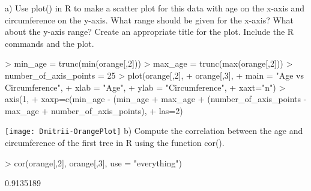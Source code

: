 \documentclass[12pt]{article}
\begin{document}
a) Use plot() in R to make a scatter plot for this data with age on the x-axis and
circumference on the y-axis. What range should be given for the x-axis? What about
the y-axis range? Create an appropriate title for the plot. Include the R commands and
the plot.

\begin{Schunk}
\begin{Sinput}
> min_age = trunc(min(orange[,2]))
> max_age = trunc(max(orange[,2]))
> number_of_axis_points = 25
> plot(orange[,2], 
+      orange[,3], 
+      main = "Age vs Circumference", 
+      xlab = "Age", 
+      ylab = "Circumference", 
+      xaxt="n")
> axis(1, 
+      xaxp=c(min_age - (min_age%%number_of_axis_points), 
+             max_age + (number_of_axis_points - max_age%%number_of_axis_points), 
+             number_of_axis_points), 
+      las=2)
\end{Sinput}
\end{Schunk}
\texttt{[image: Dmitrii-OrangePlot]}
\linebreak
b) Compute the correlation between the age and circumference of the first tree in R
using the function cor().
\begin{Schunk}
\begin{Sinput}
> cor(orange[,2], orange[,3], use = "everything")
\end{Sinput}
\begin{Soutput}
[1] 0.9135189
\end{Soutput}
\end{Schunk}
\end{document}

